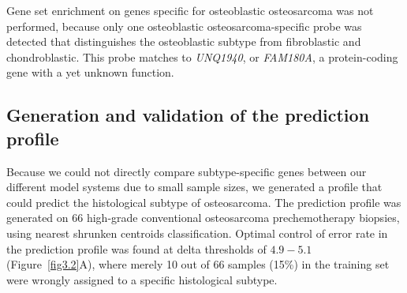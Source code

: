 Gene set enrichment on genes specific for osteoblastic
osteosarcoma was not performed, because only one
osteoblastic osteosarcoma\hyp{}specific probe was detected
that distinguishes the osteoblastic subtype from fibroblastic
and chondroblastic. This probe matches to
{\it UNQ1940}, or {\it FAM180A}, a protein\hyp{}coding gene with a
yet unknown function.

\subsection{Generation and validation of the prediction profile}
Because we could not directly compare subtype\hyp{}specific
genes between our different model systems due to small
sample sizes, we generated a profile that could predict
the histological subtype of osteosarcoma. The prediction
profile was generated on 66 high\hyp{}grade conventional
osteosarcoma prechemotherapy biopsies, using nearest
shrunken centroids classification. Optimal control of
error rate in the prediction profile was found at delta
thresholds of $4.9-5.1$ (Figure~\ref{fig3.2}A), where merely 10 out
of 66 samples (15\%) in the training set were wrongly
assigned to a specific histological subtype.
%
